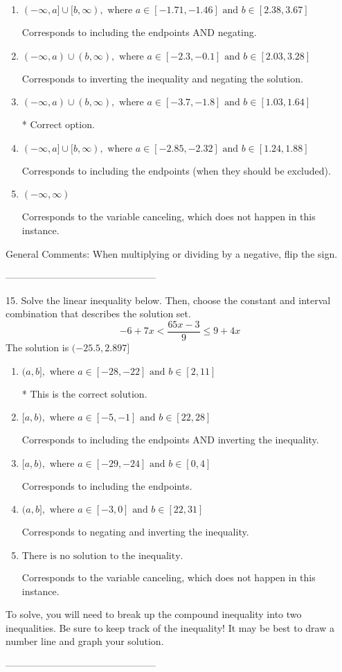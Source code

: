 \documentclass{article}[10pt]
\begin{document}
\begin{enumerate}[label=\Alph*.] 
\item $ (-\infty, a] \cup [b, \infty), \text{ where } a \in [-1.71, -1.46] \text{ and } b \in [2.38, 3.67] $ 

 Corresponds to including the endpoints AND negating. 
\item $ (-\infty, a) \cup (b, \infty), \text{ where } a \in [-2.3, -0.1] \text{ and } b \in [2.03, 3.28] $ 

 Corresponds to inverting the inequality and negating the solution. 
\item $ (-\infty, a) \cup (b, \infty), \text{ where } a \in [-3.7, -1.8] \text{ and } b \in [1.03, 1.64] $ 

  * Correct option. 
\item $ (-\infty, a] \cup [b, \infty), \text{ where } a \in [-2.85, -2.32] \text{ and } b \in [1.24, 1.88] $ 

 Corresponds to including the endpoints (when they should be excluded). 
\item $ (-\infty, \infty) $ 

 Corresponds to the variable canceling, which does not happen in this instance. 
\end{enumerate} 
 
General Comments: When multiplying or dividing by a negative, flip the sign.

-----------------------------------------------

15. Solve the linear inequality below. Then, choose the constant and interval combination that describes the solution set.
$$ -6 + 7 x < \frac{65 x - 3}{9} \leq 9 + 4 x $$ 
The solution is $ (-25.5, 2.897] $ 

\begin{enumerate}[label=\Alph*.] 
\item $ (a, b], \text{ where } a \in [-28, -22] \text{ and } b \in [2, 11] $ 

  * This is the correct solution. 
\item $ [a, b), \text{ where } a \in [-5, -1] \text{ and } b \in [22, 28] $ 

 Corresponds to including the endpoints AND inverting the inequality. 
\item $ [a, b), \text{ where } a \in [-29, -24] \text{ and } b \in [0, 4] $ 

 Corresponds to including the endpoints. 
\item $ (a, b], \text{ where } a \in [-3, 0] \text{ and } b \in [22, 31] $ 

 Corresponds to negating and inverting the inequality. 
\item $ \text{There is no solution to the inequality.} $ 

 Corresponds to the variable canceling, which does not happen in this instance. 
\end{enumerate} 
 
To solve, you will need to break up the compound inequality into two inequalities. Be sure to keep track of the inequality! It may be best to draw a number line and graph your solution.

-----------------------------------------------
\end{document}
